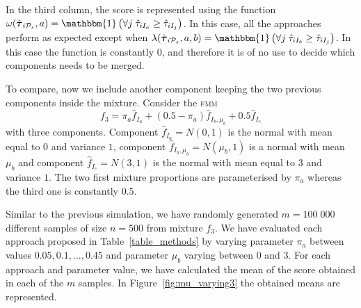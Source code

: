\documentclass[10pt, a4paper]{article}
\newcommand{\m}[1]{\boldsymbol{#1}}
\newcommand{\fmm}{\textsc{fmm}\xspace}
\begin{document}
\begin{spacing}{1.9}
In the third column, the score is represented using the function $\omega(\hat{\m \tau}_{i \mathcal{P}_s}, a) = \mathbbm{1}\left( \forall j\; \hat{\tau}_{i I_{a}} \geq \hat{\tau}_{iI_j} \right)$. In this case, all the approaches perform as expected except when $\lambda(\hat{\m \tau}_{i \mathcal{P}_s}, a, b) = \mathbbm{1}\left( \forall j\; \hat{\tau}_{i I_{b}} \geq \hat{\tau}_{iI_j} \right)$. In this case the function is constantly $0$, and therefore it is of no use to decide which components needs to be merged.


To compare, now we include another component keeping the two previous components inside the mixture. Consider the \fmm
\begin{equation}\label{three_mixture}
f_3 = \pi_a \hat{f}_{I_a} + (0.5 - \pi_a) \hat{f}_{I_b, \mu_b} + 0.5 \hat{f}_{I_c}
\end{equation}
with three components. Component $\hat{f}_{I_a} = N(0, 1)$ is the normal with mean equal to $0$ and variance $1$, component $\hat{f}_{I_b, \mu_b} = N(\mu_b, 1)$ is a normal with mean $\mu_b$ and component $\hat{f}_{I_c} = N(3, 1)$ is the normal with mean equal to $3$ and variance $1$. The two first mixture proportions are parameterised by $\pi_a$ whereas the third one is constantly $0.5$.

Similar to the previous simulation, we have  randomly generated $m=100\;000$ different samples of size $n=500$ from mixture $f_3$. We have evaluated each approach proposed in Table~\ref{table_methods} by varying parameter $\pi_a$ between values $0.05, 0.1, \dots, 0.45$ and parameter $\mu_b$ varying between $0$ and $3$. For each approach and parameter value, we have calculated the mean of the score obtained in each of the $m$ samples. In Figure~\ref{fig:mu_varying3} the obtained means are represented.


\end{spacing}
\end{document}
